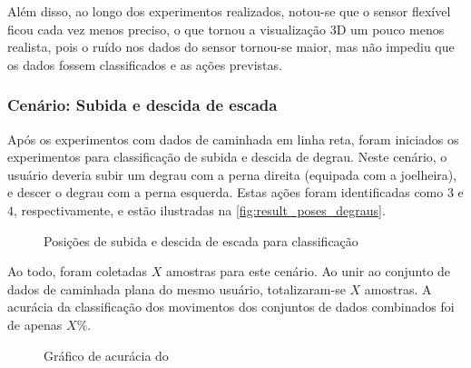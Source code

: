 

Além disso, ao longo dos experimentos realizados, notou-se que o sensor flexível ficou cada vez menos preciso, o que tornou a visualização 3D um pouco menos realista, pois o ruído nos dados do sensor tornou-se maior, mas não impediu que os dados fossem classificados e as ações previstas.

\subsubsection{Cenário: Subida e descida de escada}

Após os experimentos com dados de caminhada em linha reta, foram iniciados os experimentos para classificação de subida e descida de degrau. Neste cenário, o usuário deveria subir um degrau com a perna direita (equipada com a joelheira), e descer o degrau com a perna esquerda. Estas ações foram identificadas como \(3\) e \(4\), respectivamente, e estão ilustradas na \autoref{fig:result_poses_degraus}.

\begin{figure}[ht]
	\caption{\label{fig:result_poses_degraus}Posições de subida e descida de escada para classificação}
	\begin{center}
	\end{center}
\end{figure}

Ao todo, foram coletadas \(X\) amostras para este cenário. Ao unir ao conjunto de dados de caminhada plana do mesmo usuário, totalizaram-se \(X\) amostras. A acurácia da classificação dos movimentos dos conjuntos de dados combinados foi de apenas \(X\%\).

\begin{figure}[ht]
	\caption{\label{fig:result_accuracy_degraus_1}Gráfico de acurácia do}
	\begin{center}
	\end{center}
\end{figure}

